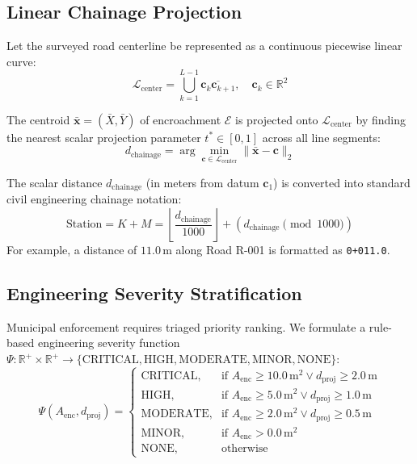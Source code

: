 \documentclass[conference]{IEEEtran}
\begin{document}
\subsection{Linear Chainage Projection}
Let the surveyed road centerline be represented as a continuous piecewise linear curve:
\begin{equation}
\mathcal{L}_{\text{center}} = \bigcup_{k=1}^{L-1} \overline{\mathbf{c}_k \mathbf{c}_{k+1}}, \quad \mathbf{c}_k \in \mathbb{R}^2
\end{equation}

The centroid $\bar{\mathbf{x}} = (\bar{X}, \bar{Y})$ of encroachment $\mathcal{E}$ is projected onto $\mathcal{L}_{\text{center}}$ by finding the nearest scalar projection parameter $t^* \in [0, 1]$ across all line segments:
\begin{equation}
d_{\text{chainage}} = \arg\min_{\mathbf{c} \in \mathcal{L}_{\text{center}}} \|\bar{\mathbf{x}} - \mathbf{c}\|_2
\end{equation}

The scalar distance $d_{\text{chainage}}$ (in meters from datum $\mathbf{c}_1$) is converted into standard civil engineering chainage notation:
\begin{equation}
\text{Station} = K + M = \left\lfloor \frac{d_{\text{chainage}}}{1000} \right\rfloor + \left(d_{\text{chainage}} \pmod{1000}\right)
\end{equation}
For example, a distance of $11.0\,\text{m}$ along Road R-001 is formatted as \texttt{0+011.0}.

\subsection{Engineering Severity Stratification}
Municipal enforcement requires triaged priority ranking. We formulate a rule-based engineering severity function $\Psi: \mathbb{R}^+ \times \mathbb{R}^+ \to \{\text{CRITICAL}, \text{HIGH}, \text{MODERATE}, \text{MINOR}, \text{NONE}\}$:
\begin{equation}
\Psi(A_{\text{enc}}, d_{\text{proj}}) = \begin{cases}
\text{CRITICAL}, & \text{if } A_{\text{enc}} \ge 10.0\,\text{m}^2 \lor d_{\text{proj}} \ge 2.0\,\text{m} \\
\text{HIGH},     & \text{if } A_{\text{enc}} \ge 5.0\,\text{m}^2 \lor d_{\text{proj}} \ge 1.0\,\text{m} \\
\text{MODERATE}, & \text{if } A_{\text{enc}} \ge 2.0\,\text{m}^2 \lor d_{\text{proj}} \ge 0.5\,\text{m} \\
\text{MINOR},    & \text{if } A_{\text{enc}} > 0.0\,\text{m}^2 \\
\text{NONE},     & \text{otherwise}
\end{cases}
\end{equation}
\end{document}
